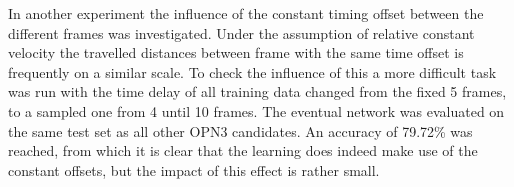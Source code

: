 In another experiment the influence of the constant timing offset between the different frames was investigated. Under the assumption of relative constant velocity the travelled distances between frame with the same time offset is frequently on a similar scale. To check the influence of this a more difficult task was run with the time delay of all training data changed from the fixed 5 frames, to a sampled one from 4 until 10 frames. The eventual network was evaluated on the same test set as all other OPN3 candidates. An accuracy of 79.72\% was reached, from which it is clear that the learning does indeed make use of the constant offsets, but the impact of this effect is rather small.




